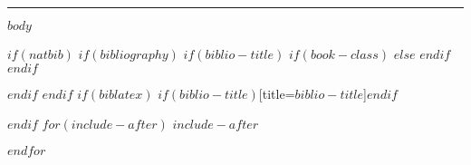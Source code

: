 \documentclass[$if(fontsize)$$fontsize$,$endif$$if(lang)$$babel-lang$,$endif$$if(papersize)$$papersize$paper,$endif$$for(classoption)$$classoption$$sep$,$endfor$]{$documentclass$}
\begin{document}
\vspace{2 mm}

\hrule

\vspace{2 mm}

\pagestyle{regular} %

$body$

$if(natbib)$
$if(bibliography)$
$if(biblio-title)$
$if(book-class)$
\renewcommand\bibname{$biblio-title$}
$else$
\renewcommand\refname{$biblio-title$}
$endif$
$endif$


$endif$
$endif$
$if(biblatex)$
\printbibliography$if(biblio-title)$[title=$biblio-title$]$endif$

$endif$
$for(include-after)$
$include-after$

$endfor$
\end{document}
